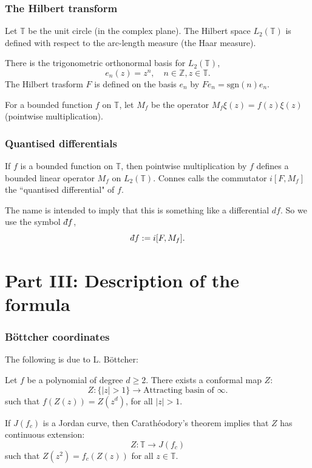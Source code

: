 \documentclass{beamer} %
\theoremstyle{definition} %
\newcommand{\Itgr}{\mathbb{Z}}
\newcommand{\Circ}{\mathbb{T}}
\newcommand{\sgn}{\mathrm{sgn}}
\def\qd{\,{\mathchar'26\mkern-12mu d}}
\begin{document}
\begin{frame}\frametitle{The Hilbert transform}
    Let $\Circ$ be the unit circle (in the complex plane). The Hilbert space $L_2(\Circ)$ is
    defined with respect to the arc-length measure (the Haar measure).
    
    There is the trigonometric orthonormal basis for $L_2(\Circ)$,
    \begin{equation*}
        e_n(z) = z^n,\quad n\in \Itgr, z \in \Circ.
    \end{equation*}
    The Hilbert trasform $F$ is defined on the basis $e_n$ by $Fe_n = \sgn(n)e_n$.
    
    
    For a bounded function $f$ on $\Circ$, let $M_f$ be the operator $M_f\xi(z) = f(z)\xi(z)$ (pointwise multiplication).
\end{frame}

\begin{frame}\frametitle{Quantised differentials}
    If $f$ is a bounded function on $\Circ$, then pointwise multiplication
    by $f$ defines a bounded linear operator $M_f$ on $L_2(\Circ)$. 
    Connes calls the commutator $i[F,M_f]$ the ``quantised differential" of $f$.
    
    The name is intended to imply that this is something like a differential $df$. So we use the symbol $\qd f$,
    \begin{equation*}
        \qd f := i[F,M_f].
    \end{equation*}
\end{frame}


\section{Part III: Description of the formula}

\begin{frame}\frametitle{B\"ottcher coordinates}
    
    The following is due to L. B\"ottcher:
    \begin{theorem}
        Let $f$ be a polynomial of degree $d \geq 2$. There exists a conformal map $Z$:
        \begin{equation*}
            Z:\{|z| > 1\}\to \text{Attracting basin of }\infty.
        \end{equation*}
        such that $f(Z(z)) = Z(z^d)$, for all $|z| > 1$.
    \end{theorem}
    If $J(f_c)$ is a Jordan curve, then Carath\'eodory's theorem implies that $Z$ has continuous extension:
    \begin{equation*}
        Z:\Circ\to J(f_c)
    \end{equation*}
    such that $Z(z^2) = f_c(Z(z))$ for all $z \in \Circ$.
\end{frame}
\end{document}
